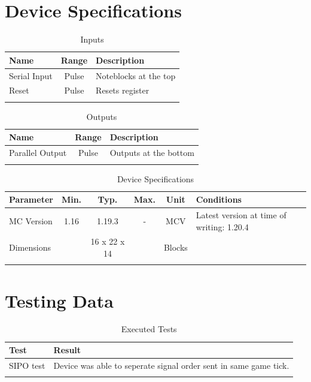 \documentclass[10pt]{datasheet}
\begin{document}
\onecolumn

\section{Device Specifications}

\begin{table}[h]
    \caption{Inputs}
    \begin{tabularx}{\textwidth}{l | c | X}
        \thickhline
        \textbf{Name} & \textbf{Range} & \textbf{Description} \\
        \hline
        Serial Input & Pulse & Noteblocks at the top \\
        \hline
        Reset & Pulse & Resets register \\
        \thickhline
\end{tabularx}
\end{table}

\begin{table}[h]
    \caption{Outputs}
    \begin{tabularx}{\textwidth}{l | c | X}
        \thickhline
        \textbf{Name} & \textbf{Range} & \textbf{Description} \\
        \hline
        Parallel Output & Pulse & Outputs at the bottom \\
        \thickhline
\end{tabularx}
\end{table}

\begin{table}[h]
    \caption{Device Specifications}
    \begin{tabularx}{\textwidth}{l | c c c | c | X}
        \thickhline
        \textbf{Parameter} & \textbf{Min.} & \textbf{Typ.} & \textbf{Max.} &
        \textbf{Unit} & \textbf{Conditions} \\
        \hline
        MC Version & 1.16 & 1.19.3 & - & MCV & Latest version at time of writing: 1.20.4\\
        \hline
        Dimensions & & 16 x 22 x 14 & & Blocks & \\
        \thickhline
\end{tabularx}
\end{table}
\newpage
\section{Testing Data}
\begin{table}[h]
\caption{Executed Tests}
\begin{tabularx}{\textwidth}{l | X}
    \thickhline
    \textbf{Test} & \textbf{Result} \\
    \hline
    SIPO test & Device was able to seperate signal order sent in same game tick. \\
    \thickhline
\end{tabularx}
\end{table}
\end{document}
